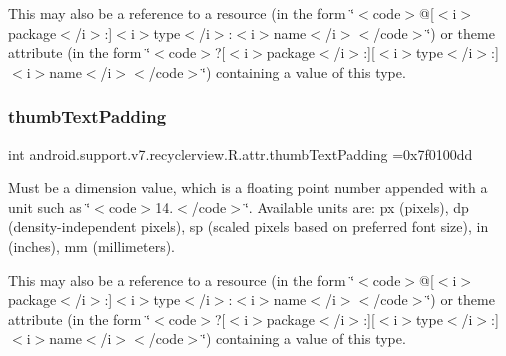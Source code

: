 This may also be a reference to a resource (in the form \char`\"{}$<$code$>$@\mbox{[}$<$i$>$package$<$/i$>$\+:\mbox{]}$<$i$>$type$<$/i$>$\+:$<$i$>$name$<$/i$>$$<$/code$>$\char`\"{}) or theme attribute (in the form \char`\"{}$<$code$>$?\mbox{[}$<$i$>$package$<$/i$>$\+:\mbox{]}\mbox{[}$<$i$>$type$<$/i$>$\+:\mbox{]}$<$i$>$name$<$/i$>$$<$/code$>$\char`\"{}) containing a value of this type. \mbox{\label{classandroid_1_1support_1_1v7_1_1recyclerview_1_1R_1_1attr_a4c07788a3b571a659f1fce1c9ac3cebd}} 
\subsubsection{\texorpdfstring{thumb\+Text\+Padding}{thumbTextPadding}}
{\footnotesize\ttfamily int android.\+support.\+v7.\+recyclerview.\+R.\+attr.\+thumb\+Text\+Padding =0x7f0100dd\hspace{0.3cm}{\ttfamily [static]}}

Must be a dimension value, which is a floating point number appended with a unit such as \char`\"{}$<$code$>$14.\+5sp$<$/code$>$\char`\"{}. Available units are\+: px (pixels), dp (density-\/independent pixels), sp (scaled pixels based on preferred font size), in (inches), mm (millimeters). 

This may also be a reference to a resource (in the form \char`\"{}$<$code$>$@\mbox{[}$<$i$>$package$<$/i$>$\+:\mbox{]}$<$i$>$type$<$/i$>$\+:$<$i$>$name$<$/i$>$$<$/code$>$\char`\"{}) or theme attribute (in the form \char`\"{}$<$code$>$?\mbox{[}$<$i$>$package$<$/i$>$\+:\mbox{]}\mbox{[}$<$i$>$type$<$/i$>$\+:\mbox{]}$<$i$>$name$<$/i$>$$<$/code$>$\char`\"{}) containing a value of this type. \mbox{\label{classandroid_1_1support_1_1v7_1_1recyclerview_1_1R_1_1attr_a47ca4afb37a36dfcdd28196efe1fe755}} 
